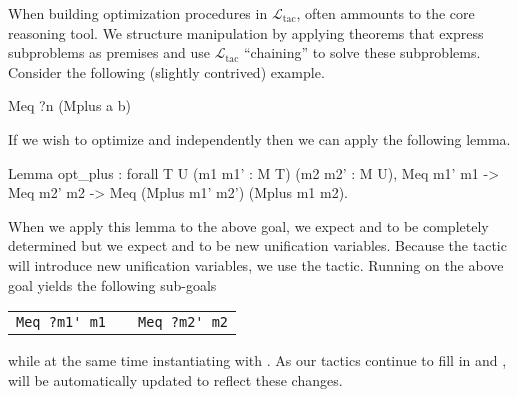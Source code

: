 \documentclass[preprint]{sigplanconf}
\newcommand{\ltac}[0]{\ensuremath{\mathcal{L}_{\mathrm{tac}}}}
\begin{document}
When building optimization procedures in \ltac{},  often ammounts to the core reasoning tool.
We structure manipulation by applying theorems that express subproblems as premises and use \ltac{} ``chaining'' to solve these subproblems.
Consider the following (slightly contrived) example.
\begin{coq}
Meq ?n (Mplus a b)
\end{coq}
If we wish to optimize  and  independently  then we can apply the following lemma.
\begin{coq}
Lemma opt_plus : forall {T U} (m1 m1' : M T) (m2 m2' : M U),
  Meq m1' m1 ->
  Meq m2' m2 ->
  Meq (Mplus m1' m2') (Mplus m1 m2).
\end{coq}
When we apply this lemma to the above goal, we expect  and  to be completely determined but we expect  and  to be new unification variables.
Because the tactic will introduce new unification variables, we use the  tactic.
Running  on the above goal yields the following sub-goals
\begin{center}
\begin{tabular}{ccc}
\lstinline!Meq ?m1' m1! & \qquad & \lstinline!Meq ?m2' m2! \\
\end{tabular}
\end{center}
while at the same time instantiating  with .
As our tactics continue to fill in  and ,  will be automatically updated to reflect these changes.





\end{document}
